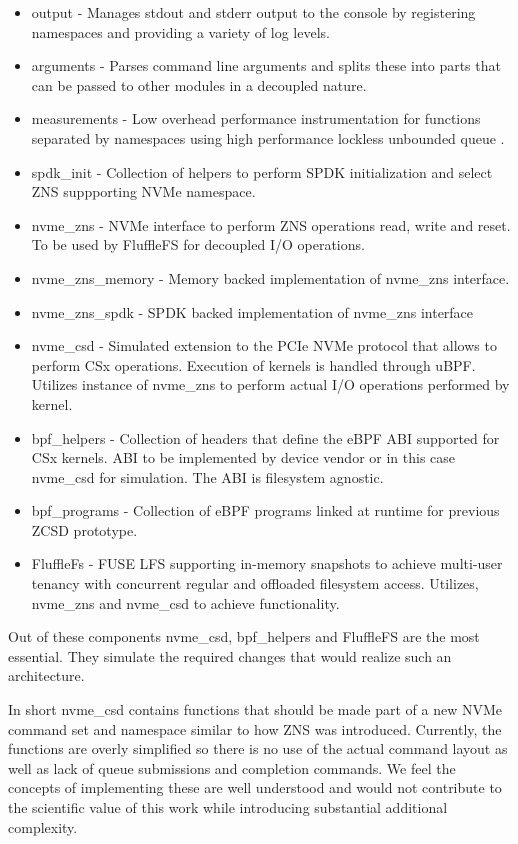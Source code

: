 \begin{itemize}
    \item output - Manages stdout and stderr output to the console by
    registering namespaces and providing a variety of log levels.
    \item arguments - Parses command line arguments and splits these into parts
    that can be passed to other modules in a decoupled nature. 
    \item measurements - Low overhead performance instrumentation for functions
    separated by namespaces using high performance lockless unbounded queue
    \cite{Michael1996SimpleFA}.
    \item spdk\_init - Collection of helpers to perform SPDK initialization and
    select ZNS suppporting NVMe namespace.
    \item nvme\_zns - NVMe interface to perform ZNS operations read, write and
    reset. To be used by FluffleFS for decoupled I/O operations.
    \item nvme\_zns\_memory - Memory backed implementation of nvme\_zns
    interface.
    \item nvme\_zns\_spdk - SPDK backed implementation of nvme\_zns interface
    \item nvme\_csd - Simulated extension to the PCIe NVMe protocol that allows
    to perform CSx operations. Execution of kernels is handled through uBPF.
    Utilizes instance of nvme\_zns to perform actual I/O operations performed by
    kernel.
    \item bpf\_helpers - Collection of headers that define the eBPF ABI
    supported for CSx kernels. ABI to be implemented by device vendor
    or in this case nvme\_csd for simulation. The ABI is filesystem agnostic.
    \item bpf\_programs - Collection of eBPF programs linked at runtime for
    previous ZCSD \cite{lukken2021zcsd} prototype.
    \item FluffleFs - FUSE LFS supporting in-memory snapshots to achieve
    multi-user tenancy with concurrent regular and offloaded filesystem access.
    Utilizes, nvme\_zns and nvme\_csd to achieve functionality.
\end{itemize}

Out of these components nvme\_csd, bpf\_helpers and FluffleFS are the most
essential. They simulate the required changes that would realize such an
architecture.

In short nvme\_csd contains functions that should be made part of a new NVMe
command set and namespace \cite{nvme-command} similar to how ZNS was introduced.
Currently, the functions are overly simplified so there is no use of the actual
command layout as well as lack of queue submissions and completion commands. We
feel the concepts of implementing these are well understood and would not
contribute to the scientific value of this work while introducing substantial
additional complexity.

